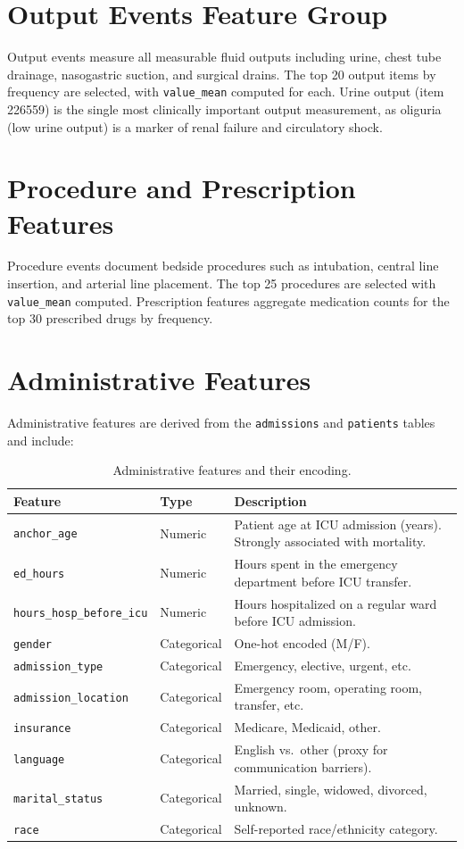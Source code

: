 \documentclass[11pt,a4paper]{report}
\begin{document}
\section{Output Events Feature Group}

Output events measure all measurable fluid outputs including urine, chest tube drainage, nasogastric suction, and surgical drains. The top 20 output items by frequency are selected, with \texttt{value\_mean} computed for each. Urine output (item 226559) is the single most clinically important output measurement, as oliguria (low urine output) is a marker of renal failure and circulatory shock.

\section{Procedure and Prescription Features}

Procedure events document bedside procedures such as intubation, central line insertion, and arterial line placement. The top 25 procedures are selected with \texttt{value\_mean} computed. Prescription features aggregate medication counts for the top 30 prescribed drugs by frequency.

\section{Administrative Features}

Administrative features are derived from the \texttt{admissions} and \texttt{patients} tables and include:

\begin{table}[H]
\centering
\caption{Administrative features and their encoding.}
\label{tab:admin_features}
\begin{tabular}{llp{7cm}}
\toprule
\textbf{Feature} & \textbf{Type} & \textbf{Description} \\
\midrule
\texttt{anchor\_age} & Numeric & Patient age at ICU admission (years). Strongly associated with mortality. \\
\texttt{ed\_hours} & Numeric & Hours spent in the emergency department before ICU transfer. \\
\texttt{hours\_hosp\_before\_icu} & Numeric & Hours hospitalized on a regular ward before ICU admission. \\
\texttt{gender} & Categorical & One-hot encoded (M/F). \\
\texttt{admission\_type} & Categorical & Emergency, elective, urgent, etc. \\
\texttt{admission\_location} & Categorical & Emergency room, operating room, transfer, etc. \\
\texttt{insurance} & Categorical & Medicare, Medicaid, other. \\
\texttt{language} & Categorical & English vs.\ other (proxy for communication barriers). \\
\texttt{marital\_status} & Categorical & Married, single, widowed, divorced, unknown. \\
\texttt{race} & Categorical & Self-reported race/ethnicity category. \\
\bottomrule
\end{tabular}
\end{table}
\end{document}
